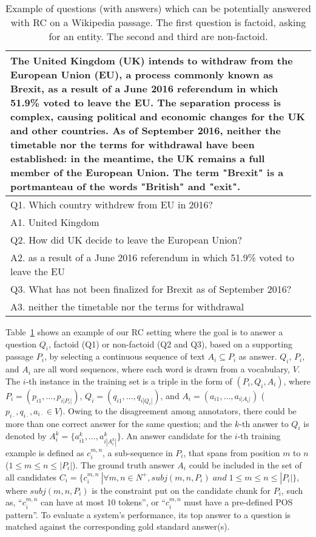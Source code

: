 \documentclass[letterpaper]{article}
\begin{document}
\begin{table}
\caption{{Example of questions (with answers) which can be potentially answered with RC on a Wikipedia passage. The first question is factoid, asking for an entity. The second and third are non-factoid.}}
\label{example}
\centering
\scriptsize
\begin{tabular}{|p{8cm}|}
\hline
The United Kingdom (UK) intends to withdraw from the European Union (EU), a process commonly known as Brexit, as a result of a June 2016 referendum in which 51.9\% voted to leave the EU. The separation process is complex, causing political and economic changes for the UK and other countries. As of September 2016, neither the timetable nor the terms for withdrawal have been established: in the meantime, the UK remains a full member of the European Union. The term "Brexit" is a portmanteau of the words "British" and "exit". \\
\hline
Q1. Which country withdrew from EU in 2016?\\A1. United Kingdom\\ \hline Q2. How did UK decide to leave the European Union? \\
A2. as a result of a June 2016 referendum in which 51.9\% voted to leave the EU \\ \hline
Q3. What has not been finalized for Brexit as of September 2016? \\
A3. neither the timetable nor the terms for withdrawal \\ \hline
\end{tabular}
\end{table}










Table~\ref{example} shows an example of our RC setting where the goal is to answer a question $Q_i$, factoid (Q1) or non-factoid (Q2 and Q3), based on a supporting passage $P_i$, by selecting a continuous sequence of text $A_i \subseteq P_i$ as answer. $Q_i$, $P_i$, and $A_i$ are all word sequences, where each word is drawn from a vocabulary, $V$.
The $i$-th instance in the training set is a triple in the form of $(P_i,Q_i,A_i)$, where $P_i = (p_{i1}, \dots, p_{i|P_i|})$, $Q_i = (q_{i1}, \dots, q_{i|Q_i|})$, and $A_i = (a_{i1}, \dots, a_{i|A_i|})$ ($p_{i\cdot},q_{i\cdot},a_{i\cdot} \in V$). Owing to the disagreement among annotators, there could be more than one correct answer for the same question; and the $k$-th answer to $Q_i$ is denoted by $A^k_i = \{a^k_{i1}, \dots, a^k_{i|A^k_i|}\}$. An answer candidate for the $i$-th training example is defined as $c_i^{m,n}$, a sub-sequence in $P_i$, that spans from position $m$ to $n$ ($1 \leq m \leq n \leq |P_i|$). The ground truth answer $A_i$ could be included in the set of all candidates $C_i= \{c_i^{m,n}\ | \forall m,n \in N^+, subj(m,n,P_i) \; and \; 1 \leq m \leq n \leq |P_i| \}$, where $subj(m,n,P_i)$ is the constraint put on the candidate chunk for $P_i$, such as, ``$c_i^{m,n}$ can have at most 10 tokens'', or ``$c_i^{m,n}$ must have a pre-defined POS pattern''. To evaluate a system's performance, its top answer to a question is matched against the corresponding gold standard answer(s).
\end{document}
